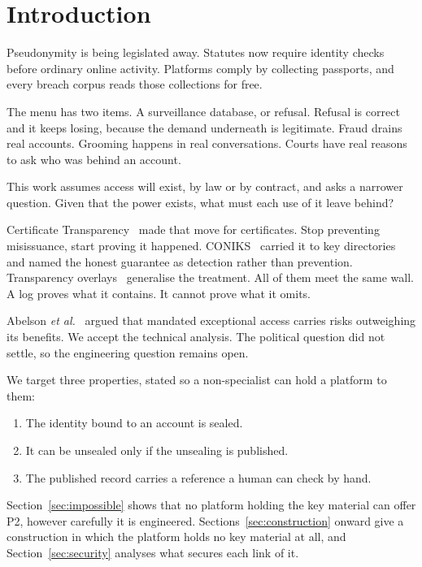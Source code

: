 \documentclass[11pt,a4paper]{article}
\begin{document}
\section{Introduction}

Pseudonymity is being legislated away. Statutes now require identity checks
before ordinary online activity. Platforms comply by collecting passports, and
every breach corpus reads those collections for free.

The menu has two items. A surveillance database, or refusal. Refusal is correct
and it keeps losing, because the demand underneath is legitimate. Fraud drains
real accounts. Grooming happens in real conversations. Courts have real reasons
to ask who was behind an account.

This work assumes access will exist, by law or by contract, and asks a narrower
question. Given that the power exists, what must each use of it leave behind?

Certificate Transparency~\cite{rfc9162} made that move for certificates. Stop
preventing misissuance, start proving it happened. CONIKS~\cite{coniks} carried
it to key directories and named the honest guarantee as detection rather than
prevention. Transparency overlays~\cite{overlays} generalise the treatment. All
of them meet the same wall. A log proves what it contains. It cannot prove what
it omits.

Abelson \emph{et al.}~\cite{doormats} argued that mandated exceptional access
carries risks outweighing its benefits. We accept the technical analysis. The
political question did not settle, so the engineering question remains open.

We target three properties, stated so a non-specialist can hold a platform to
them:

\begin{enumerate}
  \item[P1] The identity bound to an account is sealed.
  \item[P2] It can be unsealed only if the unsealing is published.
  \item[P3] The published record carries a reference a human can check by hand.
\end{enumerate}

Section~\ref{sec:impossible} shows that no platform holding the key material can
offer P2, however carefully it is engineered. Sections~\ref{sec:construction}
onward give a construction in which the platform holds no key material at all,
and Section~\ref{sec:security} analyses what secures each link of it.
\end{document}
